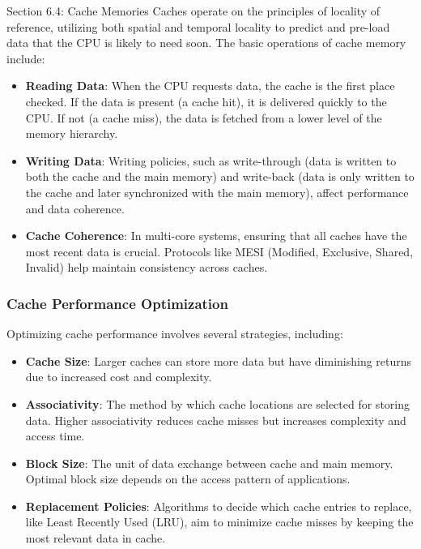 \begin{notes}{Section 6.4: Cache Memories}
    Caches operate on the principles of locality of reference, utilizing both spatial and temporal locality to predict and pre-load data that the CPU is likely to need soon. The basic operations of 
    cache memory include:
    
    \begin{itemize}
        \item \textbf{Reading Data}: When the CPU requests data, the cache is the first place checked. If the data is present (a cache hit), it is delivered quickly to the CPU. If not (a cache miss), 
        the data is fetched from a lower level of the memory hierarchy.
        \item \textbf{Writing Data}: Writing policies, such as write-through (data is written to both the cache and the main memory) and write-back (data is only written to the cache and later synchronized 
        with the main memory), affect performance and data coherence.
        \item \textbf{Cache Coherence}: In multi-core systems, ensuring that all caches have the most recent data is crucial. Protocols like MESI (Modified, Exclusive, Shared, Invalid) help maintain 
        consistency across caches.
    \end{itemize}
    
    \vspace*{1em}
    
    \subsubsection*{Cache Performance Optimization}
    
    Optimizing cache performance involves several strategies, including:
    
    \begin{itemize}
        \item \textbf{Cache Size}: Larger caches can store more data but have diminishing returns due to increased cost and complexity.
        \item \textbf{Associativity}: The method by which cache locations are selected for storing data. Higher associativity reduces cache misses but increases complexity and access time.
        \item \textbf{Block Size}: The unit of data exchange between cache and main memory. Optimal block size depends on the access pattern of applications.
        \item \textbf{Replacement Policies}: Algorithms to decide which cache entries to replace, like Least Recently Used (LRU), aim to minimize cache misses by keeping the most relevant data in cache.
    \end{itemize}
    

\end{notes}
